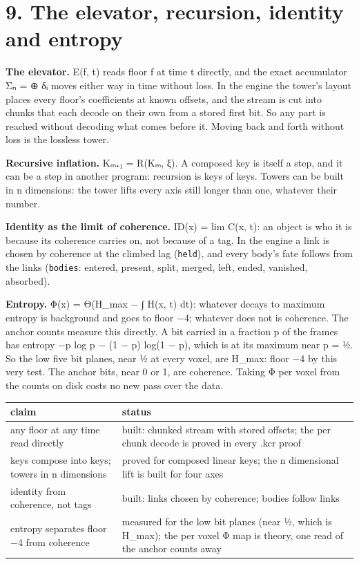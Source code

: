 \section{\texorpdfstring{9. The elevator, recursion, identity and entropy}{9. The elevator, recursion, identity and entropy}}

\textbf{The elevator.} E(f, t) reads floor f at time t directly, and the exact accumulator Σₙ = ⊕ δᵢ moves either way in time without loss. In the engine the tower's layout places every floor's coefficients at known offsets, and the stream is cut into chunks that each decode on their own from a stored first bit. So any part is reached without decoding what comes before it. Moving back and forth without loss is the lossless tower.

\textbf{Recursive inflation.} Kₘ₊₁ = R(Kₘ, ξ). A composed key is itself a step, and it can be a step in another program: recursion is keys of keys. Towers can be built in n dimensions: the tower lifts every axis still longer than one, whatever their number.

\textbf{Identity as the limit of coherence.} ID(x) = lim C(x, t): an object is who it is because its coherence carries on, not because of a tag. In the engine a link is chosen by coherence at the climbed lag (\texttt{held}), and every body's fate follows from the links (\texttt{bodies}: entered, present, split, merged, left, ended, vanished, absorbed).

\textbf{Entropy.} Φ(x) = Θ(H\_\allowbreak{}max − ∫ H(x, t) dt): whatever decays to maximum entropy is background and goes to floor −4; whatever does not is coherence. The anchor counts measure this directly. A bit carried in a fraction p of the frames has entropy −p log p − (1 − p) log(1 − p), which is at its maximum near p = ½. So the low five bit planes, near ½ at every voxel, are H\_\allowbreak{}max: floor −4 by this very test. The anchor bits, near 0 or 1, are coherence. Taking Φ per voxel from the counts on disk costs no new pass over the data.

{\small
\setlength{\tabcolsep}{6pt}
\begin{longtable}{>{\RaggedRight\arraybackslash}p{}>{\RaggedRight\arraybackslash}p{}}
\toprule
claim & status \\
\midrule
\endhead
any floor at any time read directly & built: chunked stream with stored offsets; the per chunk decode is proved in every .kcr proof \\
keys compose into keys; towers in n dimensions & proved for composed linear keys; the n dimensional lift is built for four axes \\
identity from coherence, not tags & built: links chosen by coherence; bodies follow links \\
entropy separates floor −4 from coherence & measured for the low bit planes (near ½, which is H\_\allowbreak{}max); the per voxel Φ map is theory, one read of the anchor counts away \\
\bottomrule
\end{longtable}
}

